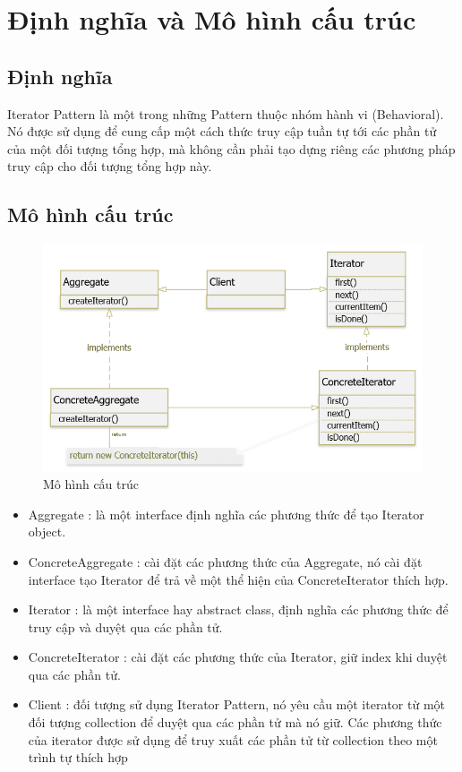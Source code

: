 \section{Định nghĩa và Mô hình cấu trúc}
\subsection{Định nghĩa}
Iterator Pattern là một trong những Pattern thuộc nhóm hành vi (Behavioral). Nó được sử dụng để cung cấp một cách thức truy cập tuần tự tới các phần tử của một đối tượng tổng hợp, mà không cần phải tạo dựng riêng các phương pháp truy cập cho đối tượng tổng hợp này.

\subsection{Mô hình cấu trúc}
\begin{figure}[!htb]
    \centering
    \includegraphics[width=\textwidth]{fig/Iterator/structure_iterator.png}
    \caption{Mô hình cấu trúc}
    \label{fig:structure_iterator}
\end{figure}

\begin{itemize}
    \item Aggregate : là một interface định nghĩa các phương thức để tạo Iterator object.
    \item ConcreteAggregate : cài đặt các phương thức của Aggregate, nó cài đặt interface tạo Iterator để trả về một thể hiện của ConcreteIterator thích hợp.
    \item Iterator : là một interface hay abstract class, định nghĩa các phương thức để truy cập và duyệt qua các phần tử.
    \item ConcreteIterator : cài đặt các phương thức của Iterator, giữ index khi duyệt qua các phần tử.
    \item Client : đối tượng sử dụng Iterator Pattern, nó yêu cầu một iterator từ một đối tượng collection để duyệt qua các phần tử mà nó giữ. Các phương thức của iterator được sử dụng để truy xuất các phần tử từ collection theo một trình tự thích hợp
\end{itemize}

